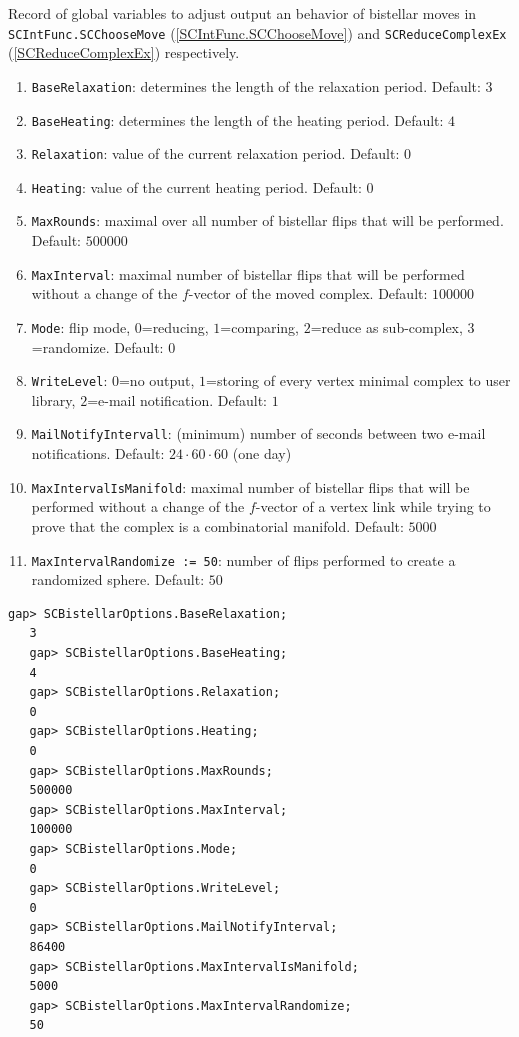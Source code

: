 \documentclass[a4paper,11pt]{report}
\begin{document}
{{{ Record of global variables to adjust output an behavior of bistellar moves in \texttt{SCIntFunc.SCChooseMove} (\ref{SCIntFunc.SCChooseMove}) and \texttt{SCReduceComplexEx} (\ref{SCReduceComplexEx}) respectively. 
\begin{enumerate}
\item \texttt{BaseRelaxation}: determines the length of the relaxation period. Default: $3$
\item \texttt{BaseHeating}: determines the length of the heating period. Default: $4$
\item \texttt{Relaxation}: value of the current relaxation period. Default: $0$
\item \texttt{Heating}: value of the current heating period. Default: $0$
\item \texttt{MaxRounds}: maximal over all number of bistellar flips that will be performed. Default: $500000$
\item \texttt{MaxInterval}: maximal number of bistellar flips that will be performed without a change of
the $f$-vector of the moved complex. Default: $100000$
\item \texttt{Mode}: flip mode, $0$=reducing, $1$=comparing, $2$=reduce as sub-complex, $3$=randomize. Default: $0$ 
\item \texttt{WriteLevel}: $0$=no output, $1$=storing of every vertex minimal complex to user library, $2$=e-mail notification. Default: $1$ 
\item \texttt{MailNotifyIntervall}: (minimum) number of seconds between two e-mail notifications. Default: $24 \cdot 60 \cdot 60$ (one day)
\item \texttt{MaxIntervalIsManifold}: maximal number of bistellar flips that will be performed without a change of
the $f$-vector of a vertex link while trying to prove that the complex is a
combinatorial manifold. Default: $5000$
\item \texttt{MaxIntervalRandomize := 50}: number of flips performed to create a randomized sphere. Default: $50$
\end{enumerate}
 
\begin{Verbatim}[commandchars=!@|,fontsize=\small,frame=single,label=Example]
   gap> SCBistellarOptions.BaseRelaxation;
   3
   gap> SCBistellarOptions.BaseHeating;
   4
   gap> SCBistellarOptions.Relaxation;
   0
   gap> SCBistellarOptions.Heating;
   0
   gap> SCBistellarOptions.MaxRounds;
   500000
   gap> SCBistellarOptions.MaxInterval;
   100000
   gap> SCBistellarOptions.Mode;
   0
   gap> SCBistellarOptions.WriteLevel;
   0
   gap> SCBistellarOptions.MailNotifyInterval;
   86400
   gap> SCBistellarOptions.MaxIntervalIsManifold;
   5000
   gap> SCBistellarOptions.MaxIntervalRandomize;
   50
   

\end{Verbatim}}}}
\end{document}
